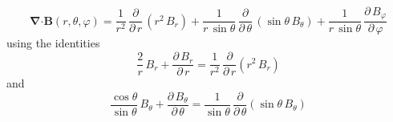 \documentclass[12pt]{article}
\begin{document}
\begin{equation}
\boldsymbol{\nabla} \boldsymbol{\cdot} \mathbf{B}(r,\theta,\varphi) = 
 \frac{1}{r^2}\,\frac{\partial}{\partial \, r} \,\left( r^2 \, B_{r} \right) +
       \frac{1}{r \, \sin \theta} \, \frac{\partial}{\partial \, \theta} \,\left(\sin \theta \, B_{\theta} \right) +
	   \frac{1}{r \, \sin \theta} \, \frac{\partial \, B_{\varphi} }{\partial \, \varphi}
\end{equation}  
using the identities
\begin{equation}
\frac{2}{r}\,B_{r} + \frac{\partial \, B_{r}}{\partial \, r} = 
 \frac{1}{r^2}\,\frac{\partial}{\partial \,r} \left(r^2\,B_{r} \right)
\end{equation}
and
\begin{equation} \label{Eq:spdiv}
\frac{\cos \theta}{\sin \theta} \,B_{\theta} + \frac{\partial \,B_{\theta}}{\partial \,\theta} = 
\frac{1}{\sin \theta} \,\frac{\partial}{\partial \, \theta} \left(\sin \theta \,B_{\theta} \right)
\end{equation}
\end{document}
